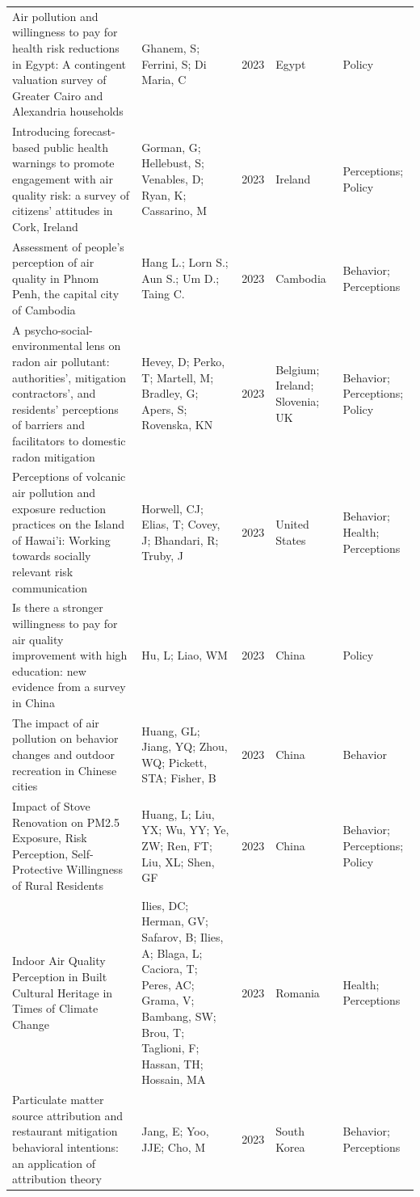 {\begin{longtable}[t]{p{6cm}p{3cm}lp{3cm}p{3cm}}
Air pollution and willingness to pay for health risk reductions in Egypt: A contingent valuation survey of Greater Cairo and Alexandria households & Ghanem, S; Ferrini, S; Di Maria, C & 2023 & Egypt & Policy\\
Introducing forecast-based public health warnings to promote engagement with air quality risk: a survey of citizens' attitudes in Cork, Ireland & Gorman, G; Hellebust, S; Venables, D; Ryan, K; Cassarino, M & 2023 & Ireland & Perceptions; Policy\\
Assessment of people's perception of air quality in Phnom Penh, the capital city of Cambodia & Hang L.; Lorn S.; Aun S.; Um D.; Taing C. & 2023 & Cambodia & Behavior; Perceptions\\
\addlinespace
A psycho-social-environmental lens on radon air pollutant: authorities', mitigation contractors', and residents' perceptions of barriers and facilitators to domestic radon mitigation & Hevey, D; Perko, T; Martell, M; Bradley, G; Apers, S; Rovenska, KN & 2023 & Belgium; Ireland; Slovenia; UK & Behavior; Perceptions; Policy\\
Perceptions of volcanic air pollution and exposure reduction practices on the Island of Hawai'i: Working towards socially relevant risk communication & Horwell, CJ; Elias, T; Covey, J; Bhandari, R; Truby, J & 2023 & United States & Behavior; Health; Perceptions\\
Is there a stronger willingness to pay for air quality improvement with high education: new evidence from a survey in China & Hu, L; Liao, WM & 2023 & China & Policy\\
The impact of air pollution on behavior changes and outdoor recreation in Chinese cities & Huang, GL; Jiang, YQ; Zhou, WQ; Pickett, STA; Fisher, B & 2023 & China & Behavior\\
Impact of Stove Renovation on PM2.5 Exposure, Risk Perception, Self-Protective Willingness of Rural Residents & Huang, L; Liu, YX; Wu, YY; Ye, ZW; Ren, FT; Liu, XL; Shen, GF & 2023 & China & Behavior; Perceptions; Policy\\
\addlinespace
Indoor Air Quality Perception in Built Cultural Heritage in Times of Climate Change & Ilies, DC; Herman, GV; Safarov, B; Ilies, A; Blaga, L; Caciora, T; Peres, AC; Grama, V; Bambang, SW; Brou, T; Taglioni, F; Hassan, TH; Hossain, MA & 2023 & Romania & Health; Perceptions\\
Particulate matter source attribution and restaurant mitigation behavioral intentions: an application of attribution theory & Jang, E; Yoo, JJE; Cho, M & 2023 & South Korea & Behavior; Perceptions\\

\end{longtable}}
